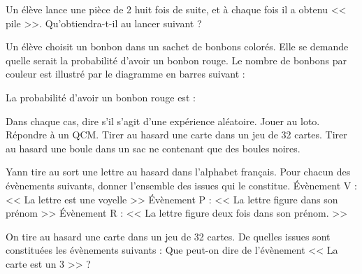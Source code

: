 \documentclass[../Cours.tex]{subfiles}
\begin{document}
\begin{questions}
    \exercice Un élève lance une pièce de \qty{2}{\EURO} huit fois de suite, et à chaque fois il a obtenu << pile >>. Qu'obtiendra-t-il au lancer suivant ?

    \exercice Un élève choisit un bonbon dans un sachet de bonbons colorés. Elle se demande quelle serait la probabilité d'avoir un bonbon rouge. Le nombre de bonbons par couleur est illustré par le diagramme en barres suivant :
    \begin{center}
    \end{center}

    \question La probabilité d'avoir un bonbon rouge est :

    \exercice Dans chaque cas, dire s'il s'agit d'une expérience aléatoire.
    \question Jouer au loto.
    \question Répondre à un QCM.
    \question Tirer au hasard une carte dans un jeu de 32 cartes.
    \question Tirer au hasard une boule dans un sac ne contenant que des boules noires.

    \exercice Yann tire au sort une lettre au hasard dans l'alphabet français. Pour chacun des évènements suivants, donner l'ensemble des issues qui le constitue.
    \question Évènement V : << La lettre est une voyelle >>
    \question Évènement P : << La lettre figure dans son prénom >>
    \question Évènement R : << La lettre figure deux fois dans son prénom. >>

    \exercice On tire au hasard une carte dans un jeu de 32 cartes.
    \question De quelles issues sont constituées les évènements suivants :
    \question Que peut-on dire de l'évènement << La carte est un 3 >> ?


\end{questions}
\end{document}
